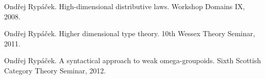 \documentclass[a4paper]{article}
\begin{document}

\begin{thebibliography}{1}

Ond\v{r}ej Ryp\'{a}\v{c}ek.
\newblock High-dimensional distributive laws.
\newblock Workshop Domains IX, 2008.

Ond\v{r}ej Ryp\'{a}\v{c}ek.
\newblock Higher dimensional type theory.
\newblock 10th Wessex Theory Seminar, 2011.

Ond\v{r}ej Ryp\'{a}\v{c}ek.
\newblock A syntactical approach to weak omega-groupoids.
\newblock Sixth Scottish Category Theory Seminar, 2012.

\end{thebibliography}
\end{document}
